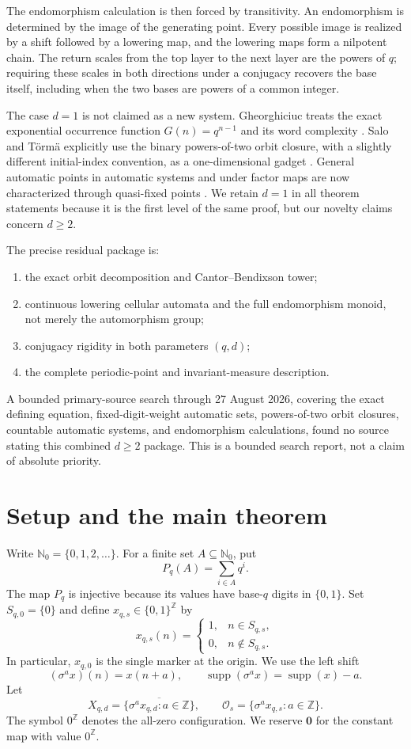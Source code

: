 \documentclass[11pt,a4paper]{amsart}
\theoremstyle{definition}
\theoremstyle{remark}
\newcommand{\N}{\mathbb N}
\newcommand{\Z}{\mathbb Z}
\newcommand{\cO}{\mathcal O}
\newcommand{\supp}{\operatorname{supp}}
\newcommand{\zz}{\mathbf 0}
\newcommand{\zero}{0^{\Z}}
\newcommand{\pq}{P_q}
\begin{document}
The endomorphism calculation is then forced by transitivity.  An endomorphism
is determined by the image of the generating point.  Every possible image is
realized by a shift followed by a lowering map, and the lowering maps form a
nilpotent chain.  The return scales from the top layer to the next layer are
the powers of $q$; requiring these scales in both directions under a
conjugacy recovers the base itself, including when the two bases are powers
of a common integer.

The case $d=1$ is not claimed as a new system.  Gheorghiciuc treats the exact
exponential occurrence function $G(n)=q^{n-1}$ and its word complexity
\cite{Gheorghiciuc2007}.  Salo and T\"orm\"a explicitly use the binary
powers-of-two orbit closure, with a slightly different initial-index
convention, as a one-dimensional gadget \cite{SaloTorma2012}.  General
automatic points in automatic systems and under factor maps are now
characterized through quasi-fixed points \cite{Krawczyk2026}.  We retain
$d=1$ in all theorem statements because it is the first level of the same
proof, but our novelty claims concern $d\geq2$.

The precise residual package is:
\begin{enumerate}
\item the exact orbit decomposition and Cantor--Bendixson tower;
\item continuous lowering cellular automata and the full endomorphism
monoid, not merely the automorphism group;
\item conjugacy rigidity in both parameters $(q,d)$;
\item the complete periodic-point and invariant-measure description.
\end{enumerate}
A bounded primary-source search through 27 August 2026, covering the exact
defining equation, fixed-digit-weight automatic sets, powers-of-two orbit
closures, countable automatic systems, and endomorphism calculations, found
no source stating this combined $d\geq2$ package.  This is a bounded search
report, not a claim of absolute priority.

\section{Setup and the main theorem}

Write $\N_0=\{0,1,2,\ldots\}$.  For a finite set $A\subseteq\N_0$, put
\[
 \pq(A)=\sum_{i\in A}q^i.
\]
The map $\pq$ is injective because its values have base-$q$ digits in
$\{0,1\}$.  Set $S_{q,0}=\{0\}$ and define $x_{q,s}\in\{0,1\}^{\Z}$ by
\[
 x_{q,s}(n)=\begin{cases}
 1,&n\in S_{q,s},\\
 0,&n\notin S_{q,s}.
 \end{cases}
\]
In particular, $x_{q,0}$ is the single marker at the origin.  We use the
left shift
\[
 (\sigma^a x)(n)=x(n+a),
 \qquad \supp(\sigma^a x)=\supp(x)-a.
\]
Let
\[
 X_{q,d}=\overline{\{\sigma^a x_{q,d}:a\in\Z\}},
 \qquad
 \cO_s=\{\sigma^a x_{q,s}:a\in\Z\}.
\]
The symbol $\zero$ denotes the all-zero configuration.  We reserve $\zz$ for
the constant map with value $\zero$.
\end{document}
